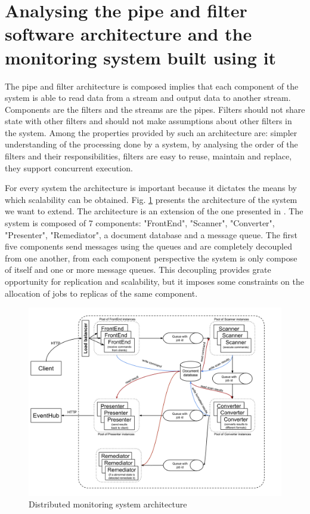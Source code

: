 \section{Analysing the pipe and filter software architecture and the monitoring system built using it}
\label{sec:architecture}
The pipe and filter architecture is composed implies that each component of the system is able to read data from a stream and output data to another stream. Components are the filters and the streams are the pipes. Filters should not share state with other filters and should not make assumptions about other filters in the system. Among the properties provided by such an architecture are: simpler understanding of the processing done by a system, by analysing the order of the filters and their responsibilities, filters are easy to reuse, maintain and replace, they support concurrent execution.

For every system the architecture is important because it dictates the means by which scalability can be obtained. Fig. \ref{fig:systemArchitecture} presents the architecture of the system we want to extend. The architecture is an extension of the one presented in \cite{IrimieAndPetcu}. The system is composed of 7 components: "FrontEnd", "Scanner", "Converter", "Presenter", "Remediator", a document database and a message queue. The first five components send messages using the queues and are completely decoupled from one another, from each component perspective the system is only compose of itself and one or more message queues. This decoupling provides grate opportunity for replication and scalability, but it imposes some constraints on the allocation of jobs to replicas of the same component.


\begin{figure}[ht]
\centering
\includegraphics[width=\linewidth]{./img/MonitoringSystemArchitectureRemediation.png}
\caption{Distributed monitoring system architecture}
\label{fig:systemArchitecture}
\end{figure}

